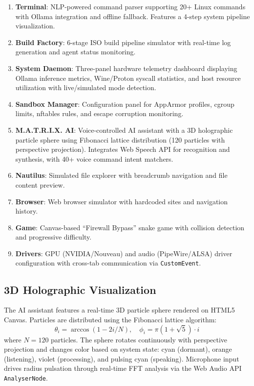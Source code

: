 \documentclass[conference]{IEEEtran}
\begin{document}
\begin{enumerate}
    \item \textbf{Terminal}: NLP-powered command parser supporting 20+ Linux commands with Ollama integration and offline fallback. Features a 4-step system pipeline visualization.
    
    \item \textbf{Build Factory}: 6-stage ISO build pipeline simulator with real-time log generation and agent status monitoring.
    
    \item \textbf{System Daemon}: Three-panel hardware telemetry dashboard displaying Ollama inference metrics, Wine/Proton syscall statistics, and host resource utilization with live/simulated mode detection.
    
    \item \textbf{Sandbox Manager}: Configuration panel for AppArmor profiles, cgroup limits, nftables rules, and escape corruption monitoring.
    
    \item \textbf{M.A.T.R.I.X. AI}: Voice-controlled AI assistant with a 3D holographic particle sphere using Fibonacci lattice distribution (120 particles with perspective projection). Integrates Web Speech API for recognition and synthesis, with 40+ voice command intent matchers.
    
    \item \textbf{Nautilus}: Simulated file explorer with breadcrumb navigation and file content preview.
    
    \item \textbf{Browser}: Web browser simulator with hardcoded sites and navigation history.
    
    \item \textbf{Game}: Canvas-based ``Firewall Bypass'' snake game with collision detection and progressive difficulty.
    
    \item \textbf{Drivers}: GPU (NVIDIA/Nouveau) and audio (PipeWire/ALSA) driver configuration with cross-tab communication via \texttt{CustomEvent}.
\end{enumerate}

\subsection{3D Holographic Visualization}

The AI assistant features a real-time 3D particle sphere rendered on HTML5 Canvas. Particles are distributed using the Fibonacci lattice algorithm:
\begin{equation}
\theta_i = \arccos(1 - 2i/N), \quad \phi_i = \pi(1 + \sqrt{5}) \cdot i
\end{equation}
where $N = 120$ particles. The sphere rotates continuously with perspective projection and changes color based on system state: cyan (dormant), orange (listening), violet (processing), and pulsing cyan (speaking). Microphone input drives radius pulsation through real-time FFT analysis via the Web Audio API \texttt{AnalyserNode}.
\end{document}
